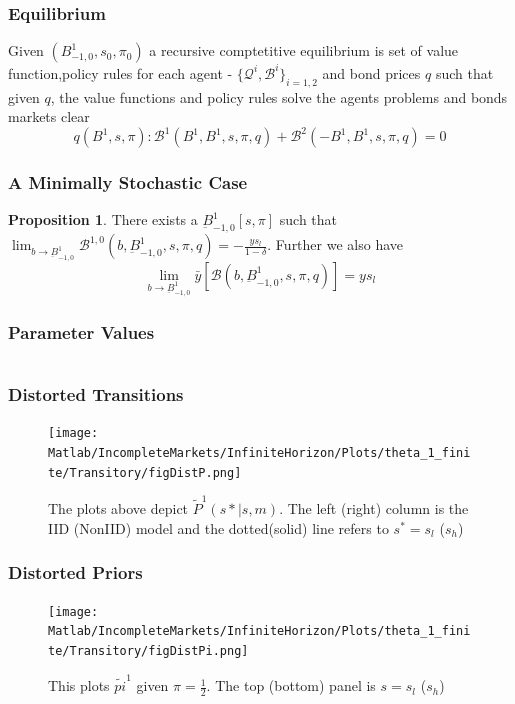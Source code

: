 \documentclass{beamer}
\theoremstyle{definition}
\newtheorem{proposition}{Proposition}%
\begin{document}
\begin{frame}
\frametitle{Equilibrium}
Given $(B^{1}_{-1,0}, s_0, \pi_0)$ a recursive comptetitive equilibrium is set of value function,policy rules for each agent - $\{\mathcal{Q}^i,\mathcal{B}^i\}_{i=1,2}$ and bond prices $q$ such that given $q$, the value functions and policy rules solve the agents problems and bonds markets clear
\[q(B^1,s,\pi) : \mathcal{B}^1(B^1,B^1,s,\pi,q)+  \mathcal{B}^2(-B^1,B^1,s,\pi,q)=0\]
\end{frame}




\begin{frame}
\frametitle{A Minimally Stochastic Case}
\begin{proposition}
\label{propo-10}
There exists a $\underbar{B}^1_{-1,0}[s,\pi]$ such that $\lim_{b\to \underbar{B}^1_{-1,0}} \mathcal{B}^{1,0}(b,\underbar{B}^1_{-1,0},s,\pi,q) = -\frac{ys_l}{1-\delta}$. Further we also have 
\[\lim_{b \to \underbar{B}^1_{-1,0}}\bar{y}[\mathcal{B}(b,\underbar{B}^1_{-1,0},s,\pi,q)] = ys_l\]
\end{proposition}
\end{frame}



\begin{frame}
\frametitle{Parameter Values}
\[\]
\end{frame}



\begin{frame}
\frametitle{Distorted Transitions}
\begin{figure}[htbp]
\centering
	  \texttt{[image: Matlab/IncompleteMarkets/InfiniteHorizon/Plots/theta\_1\_finite/Transitory/figDistP.png]}

	\caption{ The plots above depict $\tilde{P}^1(s*|s,m)$. The left (right) column is the IID (NonIID) model and the dotted(solid) line refers to $s^*=s_l$ ($s_h$)}
 
	\label{fig:DistP}
\end{figure} 
\end{frame}



\begin{frame}
\frametitle{Distorted Priors}
\begin{figure}[htbp]
\centering
	  \texttt{[image: Matlab/IncompleteMarkets/InfiniteHorizon/Plots/theta\_1\_finite/Transitory/figDistPi.png]}

	\caption{ \small{This plots $\tilde{pi}^1$ given $\pi=\frac{1}{2}$. The top (bottom) panel is $s=s_l$ ($s_h$) }}
 
	\label{fig:figDistPi}
\end{figure} 
\end{frame}
\end{document}
